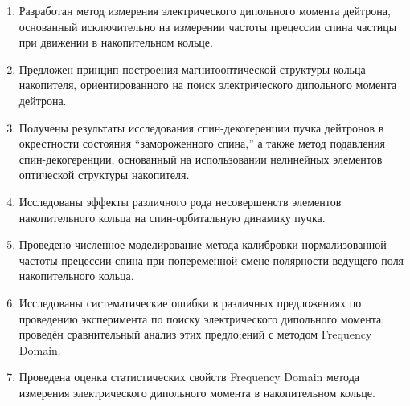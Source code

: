 
\begin{enumerate}
	\item Разработан метод измерения электрического дипольного момента дейтрона, 
	основанный исключительно на измерении частоты прецессии спина частицы 
	при движении в накопительном кольце.
	\item Предложен принцип построения магнитооптической структуры кольца-накопителя, 
	ориентированного на поиск электрического дипольного момента дейтрона.
	\item Получены результаты исследования спин-декогеренции пучка дейтронов в окрестности 
	состояния ``замороженного спина,'' а также метод подавления спин-декогеренции, основанный на использовании нелинейных элементов оптической структуры накопителя.
	\item Исследованы эффекты различного рода несовершенств элементов накопительного кольца 
	на спин-орбитальную динамику пучка.
	\item Проведено численное моделирование метода калибровки нормализованной частоты прецессии спина 
	при попеременной смене полярности ведущего поля накопительного кольца.
	\item Исследованы систематические ошибки в различных предложениях по проведению эксперимента 
	по поиску электрического дипольного момента; проведён сравнительный анализ этих предло;ений 
	с методом Frequency Domain.
	\item Проведена оценка статистических свойств Frequency Domain метода измерения 
	электрического дипольного момента в накопительном кольце.
\end{enumerate}
